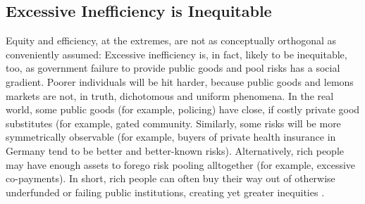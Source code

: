 \subsection{Excessive Inefficiency is Inequitable}
	\label{sec:InefficiencyIsInequitable}
Equity and efficiency, at the extremes, are not as conceptually orthogonal as conveniently assumed:
Excessive inefficiency is, in fact, likely to be inequitable, too, as government failure to provide public goods and pool risks has a social gradient.
Poorer individuals will be hit harder, because public goods and lemons markets are not, in truth, dichotomous and uniform phenomena.
In the real world, some public goods (for example, policing) have close, if costly private good substitutes (for example, gated community.
Similarly, some risks will be more symmetrically observable (for example, buyers of private health insurance in Germany tend to be better and better-known risks).
Alternatively, rich people may have enough assets to forego risk pooling alltogether (for example, excessive co-payments).
In short, rich people can often buy their way out of otherwise underfunded or failing public institutions, creating yet greater inequities \citep{Barry2002}.
%
%
%
%
